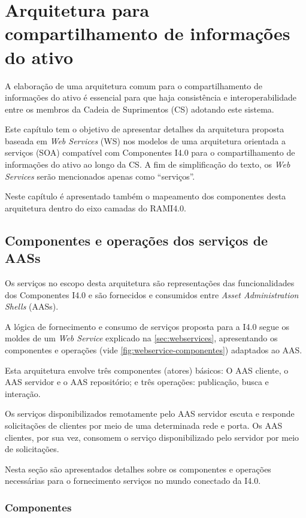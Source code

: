 \chapter{Arquitetura para compartilhamento de informações do ativo}
\label{cha:arquitetura}
	
	A elaboração de uma arquitetura comum para o compartilhamento de informações do ativo é essencial para que haja consistência e interoperabilidade entre os membros da Cadeia de Suprimentos (CS) adotando este sistema.
	
	Este capítulo tem o objetivo de apresentar detalhes da arquitetura proposta baseada em \textit{Web Services} (WS) nos modelos de uma arquitetura orientada a serviços (SOA) compatível com Componentes I4.0 para o compartilhamento de informações do ativo ao longo da CS. A fim de simplificação do texto, os \textit{Web Services} serão mencionados apenas como ``serviços''.
	
	Neste capítulo é apresentado também o mapeamento dos componentes desta arquitetura dentro do eixo camadas do RAMI4.0.
	
\section{Componentes e operações dos serviços de AASs}

	Os serviços no escopo desta arquitetura são representações das funcionalidades dos Componentes I4.0 e são fornecidos e consumidos entre \textit{Asset Administration Shells} (AASs).
	
	A lógica de fornecimento e consumo de serviços proposta para a I4.0 segue os moldes de um \textit{Web Service} explicado na \autoref{sec:webservices}, apresentando os componentes e operações (vide \autoref{fig:webservice-componentes}) adaptados ao AAS.
	
	Esta arquitetura envolve três componentes (atores) básicos: O AAS cliente, o AAS servidor e o AAS repositório; e três operações: publicação, busca e interação.

	Os serviços disponibilizados remotamente pelo AAS servidor escuta e responde solicitações de clientes por meio de uma determinada rede e porta. Os AAS clientes, por sua vez, consomem o serviço disponibilizado pelo servidor por meio de solicitações.
	
	Nesta seção são apresentados detalhes sobre os componentes e operações necessárias para o fornecimento serviços no mundo conectado da I4.0.
	
\subsection{Componentes}

